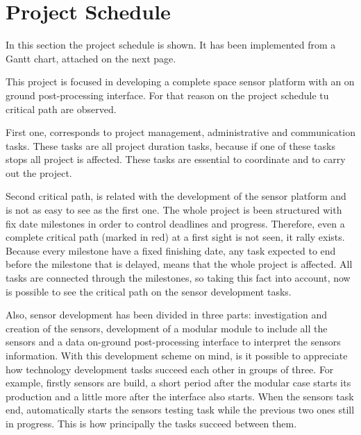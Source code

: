 \chapter{Project Schedule}
In this section the project schedule is shown. It has been implemented from a Gantt chart, attached on the next page.

This project is focused in developing a complete space sensor platform with an on ground post-processing interface. For that reason on the project schedule tu critical path are observed. 

First one, corresponds to project management, administrative and communication tasks. These tasks are all project duration tasks, because if one of these tasks stops all project is affected. These tasks are essential to coordinate and to carry out the project.

Second critical path, is related with the development of the sensor platform and is not as easy to see as the first one. The whole project is been structured with fix date milestones in order to control deadlines and progress. Therefore, even a complete critical path (marked in red) at a first sight is not seen, it rally exists. Because every milestone have a fixed finishing date, any task expected to end before the milestone that is delayed, means that the whole project is affected. All tasks are connected through the milestones, so taking this fact into account, now is possible to see the critical path on the sensor development tasks.

Also, sensor development has been divided in three parts: investigation and creation of the sensors, development of a modular module to include all the sensors and a data on-ground post-processing interface to interpret the sensors information. With this development scheme on mind, is it possible to appreciate how technology development tasks succeed each other in groups of three. For example, firstly sensors are build, a short period after the modular case starts its production and a little more after the interface also starts. When the sensors task end, automatically starts the sensors testing task while the previous two ones still in progress. This is how principally the tasks succeed between them.

